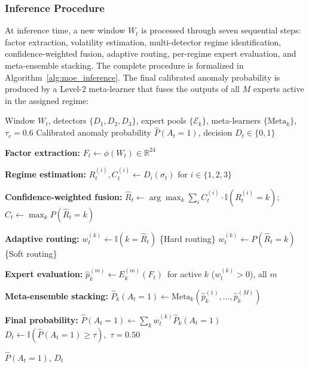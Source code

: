 \documentclass[]{interact}
\begin{document}
\subsubsection{Inference Procedure}

At inference time, a new window $W_t$ is processed through seven sequential steps: factor extraction, volatility estimation, multi-detector regime identification, confidence-weighted fusion, adaptive routing, per-regime expert evaluation, and meta-ensemble stacking. The complete procedure is formalized in Algorithm~\ref{alg:moe_inference}. The final calibrated anomaly probability is produced by a Level-2 meta-learner that fuses the outputs of all $M$ experts active in the assigned regime:
\begin{algorithm}[htb]
\caption{Regime-Conditioned Meta-Ensemble: Inference}
\label{alg:moe_inference}
\begin{algorithmic}[1]
\raggedright %
\REQUIRE Window $W_t$, detectors $\{D_1, D_2, D_3\}$, expert pools $\{\mathcal{E}_k\}$, meta-learners $\{\text{Meta}_k\}$, $\tau_c = 0.6$
\ENSURE Calibrated anomaly probability $\hat{P}(A_t = 1)$, decision $D_t \in \{0,1\}$

\STATE \textbf{Factor extraction:} $F_t \leftarrow \phi(W_t) \in \mathbb{R}^{24}$

\STATE \textbf{Regime estimation:} $R_t^{(i)}, C_t^{(i)} \leftarrow D_i(\sigma_t)$ for $i \in \{1,2,3\}$

\STATE \textbf{Confidence-weighted fusion:}
\STATE \hspace{2em} $\hat{R}_t \leftarrow \arg\max_k \sum_i C_t^{(i)} \cdot \mathbb{I}(R_t^{(i)} = k)$;\ $C_t \leftarrow \max_k P(\hat{R}_t = k)$

\STATE \textbf{Adaptive routing:}
    \STATE $w_t^{(k)} \leftarrow \mathbb{I}(k = \hat{R}_t)$ \hfill \{Hard routing\}
\ELSE
    \STATE $w_t^{(k)} \leftarrow P(\hat{R}_t = k)$ \hfill \{Soft routing\}
\ENDIF

\STATE \textbf{Expert evaluation:} $\hat{p}_k^{(m)} \leftarrow E_k^{(m)}(F_t)$\ for active $k$ ($w_t^{(k)}>0$), all $m$

\STATE \textbf{Meta-ensemble stacking:}
\STATE \hspace{2em} $\hat{P}_k(A_t\!=\!1) \leftarrow \text{Meta}_k\!\left(\hat{p}_k^{(1)}, \ldots, \hat{p}_k^{(M)}\right)$

\STATE \textbf{Final probability:} $\hat{P}(A_t\!=\!1) \leftarrow \sum_k w_t^{(k)} \hat{P}_k(A_t\!=\!1)$
\STATE \hspace{2em} $D_t \leftarrow \mathbb{I}\!\left(\hat{P}(A_t\!=\!1) \geq \tau\right)$,\ $\tau = 0.50$

\RETURN $\hat{P}(A_t = 1)$, $D_t$
\end{algorithmic}
\end{algorithm}
\end{document}
